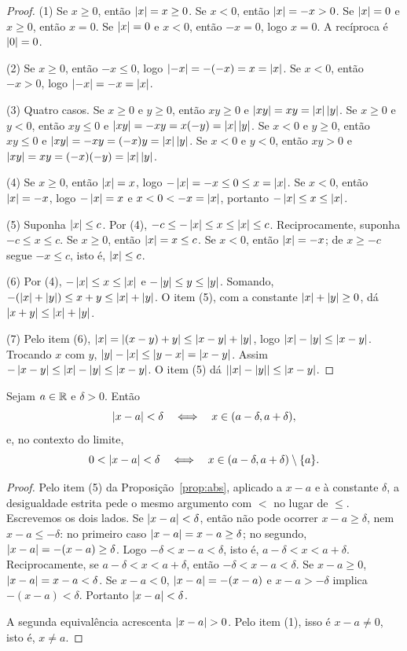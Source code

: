 \documentclass[11pt,a4paper]{article}
\begin{document}
\begin{proof}
(1) Se $x\ge 0$, ent\~ao $\abs{x}=x\ge 0$. Se $x<0$, ent\~ao $\abs{x}=-x>0$. Se $\abs{x}=0$ e $x\ge 0$, ent\~ao $x=0$. Se $\abs{x}=0$ e $x<0$, ent\~ao $-x=0$, logo $x=0$. A rec\'iproca \'e $\abs{0}=0$.

(2) Se $x\ge 0$, ent\~ao $-x\le 0$, logo $\abs{-x}=-(-x)=x=\abs{x}$. Se $x<0$, ent\~ao $-x>0$, logo $\abs{-x}=-x=\abs{x}$.

(3) Quatro casos. Se $x\ge 0$ e $y\ge 0$, ent\~ao $xy\ge 0$ e $\abs{xy}=xy=\abs{x}\abs{y}$. Se $x\ge 0$ e $y<0$, ent\~ao $xy\le 0$ e $\abs{xy}=-xy=x(-y)=\abs{x}\abs{y}$. Se $x<0$ e $y\ge 0$, ent\~ao $xy\le 0$ e $\abs{xy}=-xy=(-x)y=\abs{x}\abs{y}$. Se $x<0$ e $y<0$, ent\~ao $xy>0$ e $\abs{xy}=xy=(-x)(-y)=\abs{x}\abs{y}$.

(4) Se $x\ge 0$, ent\~ao $\abs{x}=x$, logo $-\abs{x}=-x\le 0\le x=\abs{x}$. Se $x<0$, ent\~ao $\abs{x}=-x$, logo $-\abs{x}=x$ e $x<0<-x=\abs{x}$, portanto $-\abs{x}\le x\le \abs{x}$.

(5) Suponha $\abs{x}\le c$. Por (4), $-c\le -\abs{x}\le x\le \abs{x}\le c$. Reciprocamente, suponha $-c\le x\le c$. Se $x\ge 0$, ent\~ao $\abs{x}=x\le c$. Se $x<0$, ent\~ao $\abs{x}=-x$; de $x\ge -c$ segue $-x\le c$, isto \'e, $\abs{x}\le c$.

(6) Por (4), $-\abs{x}\le x\le \abs{x}$ e $-\abs{y}\le y\le \abs{y}$. Somando, $-(\abs{x}+\abs{y})\le x+y\le \abs{x}+\abs{y}$. O item (5), com a constante $\abs{x}+\abs{y}\ge 0$, d\'a $\abs{x+y}\le \abs{x}+\abs{y}$.

(7) Pelo item (6), $\abs{x}=\abs{(x-y)+y}\le \abs{x-y}+\abs{y}$, logo $\abs{x}-\abs{y}\le \abs{x-y}$. Trocando $x$ com $y$, $\abs{y}-\abs{x}\le \abs{y-x}=\abs{x-y}$. Assim $-\abs{x-y}\le \abs{x}-\abs{y}\le \abs{x-y}$. O item (5) d\'a $\abs{\abs{x}-\abs{y}}\le \abs{x-y}$.
\end{proof}

\begin{proposicao}
\label{prop:viz}
Sejam $a\in\R$ e $\delta>0$. Ent\~ao
\[
\abs{x-a}<\delta \quad\Longleftrightarrow\quad x\in(a-\delta,a+\delta),
\]
e, no contexto do limite,
\[
0<\abs{x-a}<\delta \quad\Longleftrightarrow\quad x\in(a-\delta,a+\delta)\setminus\{a\}.
\]
\end{proposicao}

\begin{proof}
Pelo item (5) da Proposi\c{c}\~ao~\ref{prop:abs}, aplicado a $x-a$ e \`a constante $\delta$, a desigualdade estrita pede o mesmo argumento com $<$ no lugar de $\le$. Escrevemos os dois lados. Se $\abs{x-a}<\delta$, ent\~ao n\~ao pode ocorrer $x-a\ge \delta$, nem $x-a\le -\delta$: no primeiro caso $\abs{x-a}=x-a\ge \delta$; no segundo, $\abs{x-a}=-(x-a)\ge \delta$. Logo $-\delta<x-a<\delta$, isto \'e, $a-\delta<x<a+\delta$. Reciprocamente, se $a-\delta<x<a+\delta$, ent\~ao $-\delta<x-a<\delta$. Se $x-a\ge 0$, $\abs{x-a}=x-a<\delta$. Se $x-a<0$, $\abs{x-a}=-(x-a)$ e $x-a>-\delta$ implica $-(x-a)<\delta$. Portanto $\abs{x-a}<\delta$.

A segunda equival\^encia acrescenta $\abs{x-a}>0$. Pelo item (1), isso \'e $x-a\neq 0$, isto \'e, $x\neq a$.
\end{proof}
\end{document}
